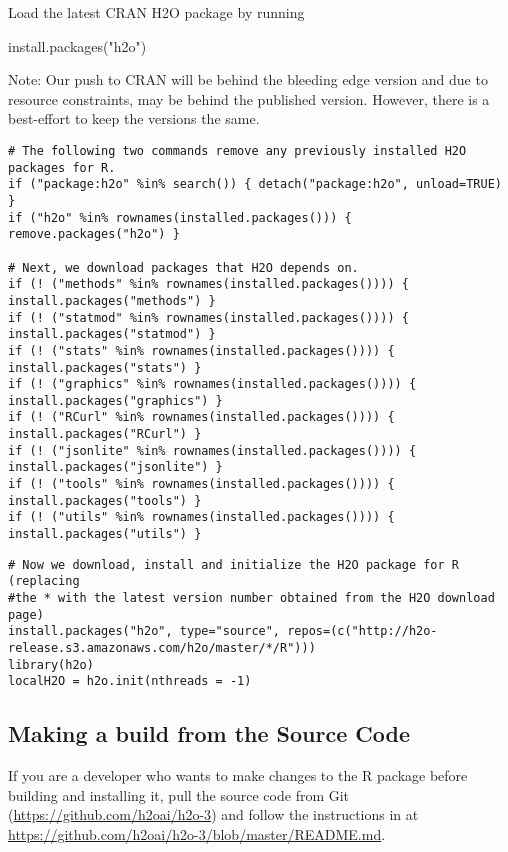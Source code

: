 Load the latest CRAN H2O package by running \begin{spverbatim} install.packages("h2o") \end{spverbatim} 

Note: Our push to CRAN will be behind the bleeding edge version and due to resource constraints, may be behind the published version. However, there is a best-effort to keep the versions the same. 

\begin{lstlisting}[style=R]
# The following two commands remove any previously installed H2O packages for R.
if ("package:h2o" %in% search()) { detach("package:h2o", unload=TRUE) }
if ("h2o" %in% rownames(installed.packages())) { remove.packages("h2o") }

# Next, we download packages that H2O depends on.
if (! ("methods" %in% rownames(installed.packages()))) { install.packages("methods") }
if (! ("statmod" %in% rownames(installed.packages()))) { install.packages("statmod") }
if (! ("stats" %in% rownames(installed.packages()))) { install.packages("stats") }
if (! ("graphics" %in% rownames(installed.packages()))) { install.packages("graphics") }
if (! ("RCurl" %in% rownames(installed.packages()))) { install.packages("RCurl") }
if (! ("jsonlite" %in% rownames(installed.packages()))) { install.packages("jsonlite") }
if (! ("tools" %in% rownames(installed.packages()))) { install.packages("tools") }
if (! ("utils" %in% rownames(installed.packages()))) { install.packages("utils") }
\end{lstlisting}


\begin{lstlisting}[style=R]
# Now we download, install and initialize the H2O package for R (replacing
#the * with the latest version number obtained from the H2O download page)
install.packages("h2o", type="source", repos=(c("http://h2o-release.s3.amazonaws.com/h2o/master/*/R")))
library(h2o)
localH2O = h2o.init(nthreads = -1)
\end{lstlisting}

\subsection{Making a build from the Source Code}
If you are a developer who wants to make changes to the R package before building and installing it, pull the source code from Git ({\url{https://github.com/h2oai/h2o-3}}) and follow the instructions in at {\url{https://github.com/h2oai/h2o-3/blob/master/README.md}}.

